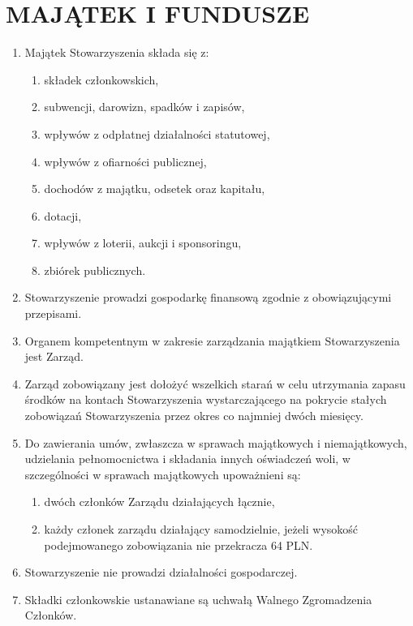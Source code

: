 \documentclass{article}
\begin{document}
\section{MAJĄTEK I FUNDUSZE}
  \begin{enumerate}
    \item Majątek Stowarzyszenia składa się z:
      \begin{enumerate}
        \item składek członkowskich,
        \item subwencji, darowizn, spadków i zapisów,
        \item wpływów z odpłatnej działalności statutowej,
        \item wpływów z ofiarności publicznej,
        \item dochodów z majątku, odsetek oraz kapitału,
        \item dotacji,
        \item wpływów z loterii, aukcji i sponsoringu,
        \item zbiórek publicznych.
      \end{enumerate}
    \item Stowarzyszenie prowadzi gospodarkę finansową zgodnie z obowiązującymi przepisami.
    \item Organem kompetentnym w zakresie zarządzania majątkiem Stowarzyszenia jest Zarząd.
    \item Zarząd zobowiązany jest dołożyć wszelkich starań w celu utrzymania zapasu środków na kontach Stowarzyszenia wystarczającego na pokrycie stałych zobowiązań Stowarzyszenia przez okres co najmniej dwóch miesięcy.
    \item Do zawierania umów, zwłaszcza w sprawach majątkowych i niemajątkowych, udzielania pełnomocnictwa i składania innych oświadczeń woli, w szczególności w sprawach majątkowych upoważnieni są:
      \begin{enumerate}
        \item dwóch członków Zarządu działających łącznie,
        \item każdy członek zarządu działający samodzielnie, jeżeli wysokość podejmowanego zobowiązania nie przekracza 64 PLN.
      \end{enumerate}
    \item Stowarzyszenie nie prowadzi działalności gospodarczej.
    \item Składki członkowskie ustanawiane są uchwałą Walnego Zgromadzenia Członków.
  \end{enumerate}
\end{document}
